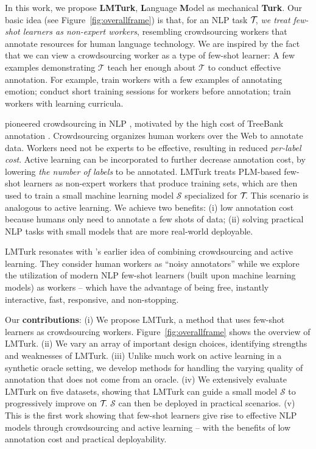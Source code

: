 \documentclass[11pt]{article}
\def\tasksymbol{$\mathcal{T\mkern-5mu}$\xspace}
\def\md{LMTurk\xspace}
\def\figref#1{Figure~\ref{fig:#1}}
\begin{document}
In this work, we propose
\textbf{\md},
\textbf{L}anguage
\textbf{M}odel as
mechanical \textbf{Turk}.
Our basic idea (see \figref{overallframe}) is that, for an NLP task \tasksymbol,
\emph{we treat few-shot learners as non-expert workers},
resembling crowdsourcing workers that annotate resources for
human language technology.
We are inspired by the fact that  we can view a
crowdsourcing worker
as a type of few-shot learner:  A few examples
demonstrating $\mathcal{T}$ teach her
enough about $\mathcal{T}$ to
conduct effective annotation.
For example, \citet{snow-etal-2008-cheap} train workers
with a few examples of annotating emotion;
\citet{he-etal-2015-question} conduct short training sessions
for workers before annotation;
\citet{lee2021annotation}  train
workers with
learning curricula.

\citet{snow-etal-2008-cheap} pioneered crowdsourcing
in NLP \citep{howe2006rise,howe2008crowdsourcing}, motivated
by the high cost of TreeBank annotation \citep{marcus-etal-1993-building,
miller-etal-1993-semantic}.
Crowdsourcing organizes
human workers over the Web
to annotate data.
Workers need not be experts to be effective, resulting in
reduced \emph{per-label cost}.
Active learning \citep{hachey-etal-2005-investigating,felder2009active} can be incorporated
\citep{laws-etal-2011-activeb} to further decrease annotation cost, by lowering
\emph{the number of labels}
to be annotated.
\md treats PLM-based
few-shot learners as
non-expert workers that
produce training sets, which are
then used to
train a small
machine learning model
$\mathcal{S}$ specialized for
\tasksymbol.
This
scenario is analogous to
active learning.
We achieve two benefits:
(i) low annotation cost
because humans only need to annotate a few shots of data;
(ii) solving practical
NLP tasks with small models
that are more real-world deployable.


\md
resonates with
\citet{laws-etal-2011-activeb}'s
earlier idea of
combining crowdsourcing and
active learning.
They consider
human workers
as ``noisy annotators''
while we explore the utilization
of modern NLP few-shot learners
(built upon machine learning models)
as workers --
which have the advantage of
being free,
instantly interactive,
fast, responsive, and non-stopping.


Our \textbf{contributions}: (i) We propose \md, a method
that uses few-shot learners as crowdsourcing workers.
\figref{overallframe} shows the overview of \md.
(ii) We vary an array of important design
choices, identifying strengths and weaknesses of \md.
(iii) Unlike much work on active learning  in
a synthetic oracle setting,
we develop methods for handling the
varying quality
of annotation  that does not come from an oracle.
(iv) We extensively evaluate \md on five
datasets, showing that \md can guide a small model
$\mathcal{S}$ to progressively improve on \tasksymbol.
$\mathcal{S}$ can then be deployed in practical scenarios.
(v) This is the
first work
showing that few-shot learners
give rise to effective NLP models
through crowdsourcing and active
learning -- with the benefits of low annotation cost and
practical deployability.
\end{document}
